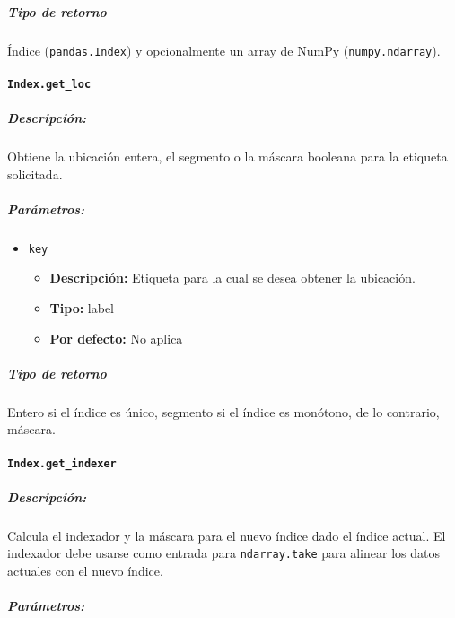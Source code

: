 \subparagraph{Tipo de retorno}
Índice (\texttt{pandas.Index}) y opcionalmente un array de NumPy
(\texttt{numpy.ndarray}).

\paragraph{\texttt{Index.get\_loc}}

\subparagraph{Descripción:}
Obtiene la ubicación entera, el segmento o la máscara booleana para la etiqueta
solicitada.

\subparagraph{Parámetros:}

\begin{itemize}
    \item \texttt{key}
          \begin{itemize}
              \item \textbf{Descripción:} Etiqueta para la cual se desea
                    obtener la ubicación.
              \item \textbf{Tipo:} label
              \item \textbf{Por defecto:} No aplica
          \end{itemize}
\end{itemize}

\subparagraph{Tipo de retorno}
Entero si el índice es único, segmento si el índice es monótono, de lo
contrario, máscara.

\paragraph{\texttt{Index.get\_indexer}}

\subparagraph{Descripción:}
Calcula el indexador y la máscara para el nuevo índice dado el índice actual.
El indexador debe usarse como entrada para \texttt{ndarray.take} para alinear
los datos actuales con el nuevo índice.

\subparagraph{Parámetros:}

